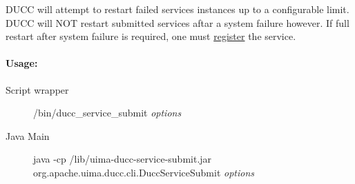     DUCC will attempt to restart failed services instances up to a configurable limit.  DUCC will
    NOT restart submitted services aftar a system failure however.  If full restart after system
    failure is required, one must \hyperref[subsec:cli.ducc-services.register]{register} the
    service.
 

    \paragraph{Usage:}
    \begin{description}
    \item[Script wrapper] \ducchome/bin/ducc\_service\_submit {\em options}
    \item[Java Main]      java -cp \ducchome/lib/uima-ducc-service-submit.jar org.apache.uima.ducc.cli.DuccServiceSubmit {\em options}
    \end{description}

